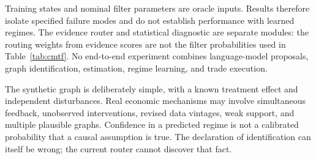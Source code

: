 Training states and nominal filter parameters are oracle inputs. Results therefore isolate specified failure modes and do not establish performance with learned regimes. The evidence router and statistical diagnostic are separate modules: the routing weights from evidence scores are not the filter probabilities used in Table~\ref{tab:cmtf}. No end-to-end experiment combines language-model proposals, graph identification, estimation, regime learning, and trade execution.

The synthetic graph is deliberately simple, with a known treatment effect and independent disturbances. Real economic mechanisms may involve simultaneous feedback, unobserved interventions, revised data vintages, weak support, and multiple plausible graphs. Confidence in a predicted regime is not a calibrated probability that a causal assumption is true. The declaration of identification can itself be wrong; the current router cannot discover that fact.

